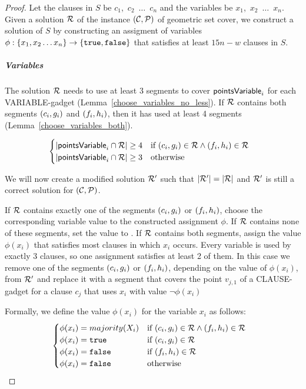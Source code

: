 \begin{proof}\leavevmode
Let the clauses in $S$ be $c_1$,~$c_2$~$\ldots$~$c_n$
and the variables be $x_1$,~$x_2$~$\ldots$~$x_n$.
Given a solution $\mathcal{R}$
of the instance $(\mathcal{C}, \mathcal{P})$ of geometric set cover,
we construct a solution of $S$ by constructing an
assigment of variables 
$\phi : \{ x_1, x_2 \ldots x_n\} \rightarrow \{\texttt{true}, \texttt{false}\}$
that satisfies at least $15n-w$ clauses in $S$.

\subparagraph{Variables}
The solution $\mathcal{R}$ needs to use at least 3 segments
to cover $\mathsf{pointsVariable}_{i}$
for each VARIABLE-gadget (Lemma~\ref{choose_variables_no_less}).
If $\mathcal{R}$ contains both segments $(c_{i}, g_{i})$ and $(f_{i}, h_{i})$,
then it has used at least 4 segments (Lemma~\ref{choose_variables_both}).


\begin{align}
	\begin{split}
	& \begin{cases}
	|\mathsf{pointsVariable}_{i} \cap \mathcal{R}| \ge 4 & \text{if}\ (c_{i}, g_{i}) \in \mathcal{R} \land (f_{i}, h_{i}) \in \mathcal{R} \\
	|\mathsf{pointsVariable}_{i} \cap \mathcal{R}| \ge 3 & \text{otherwise}
	\end{cases}
	\end{split}
\end{align}

We will now create a modified solution $\mathcal{R}'$ such that $|\mathcal{R}'|=|\mathcal{R}|$
and $\mathcal{R}'$ is still a correct solution for $(\mathcal{C}, \mathcal{P})$.

If $\mathcal{R}$ contains exactly one of the segments $(c_{i}, g_{i})$ or $(f_{i}, h_{i})$,
choose the corresponding variable value to the constructed assignment $\phi$.
If $\mathcal{R}$ contains none of these segments, set the value to \false.
If $\mathcal{R}$ contains both segments,
assign the value $\phi(x_i)$ that satisfies most clauses
in which $x_i$ occurs.
Every variable is used by exactly 3 clauses,
so one assignment satisfies at least 2 of them.
In this case we remove one of the segments $(c_{i}, g_{i})$
or $(f_{i}, h_{i})$, depending on the value of $\phi(x_i)$,
from $\mathcal{R}'$ and replace it
with a segment that covers the point $v_{j,1}$
of a CLAUSE-gadget for a clause $c_j$ that uses $x_i$ with value $\neg\phi(x_i)$

Formally, we define the value $\phi(x_i)$ for the variable $x_i$ as follows:
\begin{align}
	\begin{split}
	\label{eqn:variable_assignment}
	& \begin{cases}
	\phi(x_i) = majority(X_i) & \text{if}\ (c_{i}, g_{i}) \in \mathcal{R} \land (f_{i}, h_{i}) \in \mathcal{R} \\
	\phi(x_i) = \texttt{true} & \text{if}\ (c_{i}, g_{i}) \in \mathcal{R} \\
	\phi(x_i) = \texttt{false} & \text{if}\ (f_{i}, h_{i}) \in \mathcal{R} \\
	\phi(x_i) = \texttt{false} & \text{otherwise}
	\end{cases}
	\end{split}
\end{align}


\end{proof}

